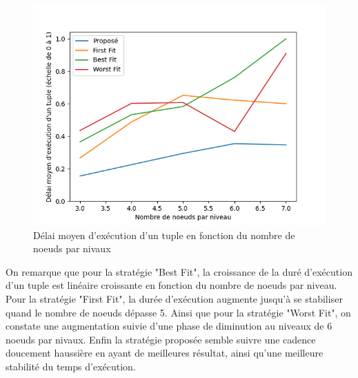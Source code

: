 \begin{figure}[H]
    \centering
    \includegraphics[]{src/ressources/tupleDelayPerLvl.png}
    \caption{Délai moyen d'exécution d’un tuple en fonction du nombre de noeuds par nivaux}
    \label{fig:}
\end{figure}
On remarque que pour la stratégie "Best Fit", la croissance de la duré d'exécution d'un tuple est linéaire croissante en fonction du nombre de noeuds par niveau. Pour la stratégie "First Fit", la durée d'exécution augmente jusqu'à se stabiliser quand le nombre de noeuds dépasse 5. Ainsi que pour la stratégie "Worst Fit", on constate une augmentation suivie d'une phase de diminution au niveaux de 6 noeuds par nivaux. Enfin la stratégie proposée semble suivre une cadence doucement haussière en ayant de meilleures résultat, ainsi qu'une meilleure stabilité du temps d'exécution.

